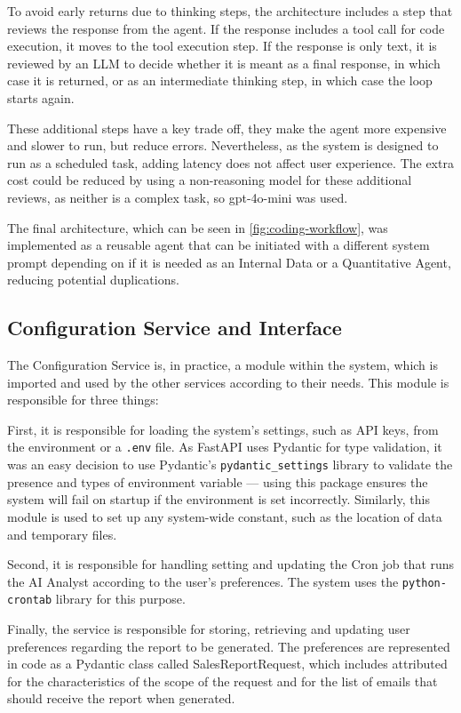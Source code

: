 \documentclass[a4paper]{report}
\begin{document}
To avoid early returns due to thinking steps, the architecture includes a step that reviews the response from the agent. If the response includes a tool call for code execution, it moves to the tool execution step. If the response is only text, it is reviewed by an LLM to decide whether it is meant as a final response, in which case it is returned, or as an intermediate thinking step, in which case the loop starts again.

These additional steps have a key trade off, they make the agent more expensive and slower to run, but reduce errors. Nevertheless, as the system is designed to run as a scheduled task, adding latency does not affect user experience. The extra cost could be reduced by using a non-reasoning model for these additional reviews, as neither is a complex task, so gpt-4o-mini was used.

The final architecture, which can be seen in \autoref{fig:coding-workflow}, was implemented as a reusable agent that can be initiated with a different system prompt depending on if it is needed as an Internal Data or a Quantitative Agent, reducing potential duplications.

\subsection{Configuration Service and Interface}
\label{subsec:config-implementation}

The Configuration Service is, in practice, a module within the system, which is imported and used by the other services according to their needs. This module is responsible for three things:

First, it is responsible for loading the system's settings, such as API keys, from the environment or a \texttt{.env} file. As FastAPI uses Pydantic for type validation, it was an easy decision to use Pydantic's \texttt{pydantic\_settings} library to validate the presence and types of environment variable --- using this package ensures the system will fail on startup if the environment is set incorrectly. Similarly, this module is used to set up any system-wide constant, such as the location of data and temporary files.

Second, it is responsible for handling setting and updating the Cron job that runs the AI Analyst according to the user's preferences. The system uses the \texttt{python-crontab} library for this purpose.

Finally, the service is responsible for storing, retrieving and updating user preferences regarding the report to be generated. The preferences are represented in code as a Pydantic class called SalesReportRequest, which includes attributed for the characteristics of the scope of the request and for the list of emails that should receive the report when generated.
\end{document}
